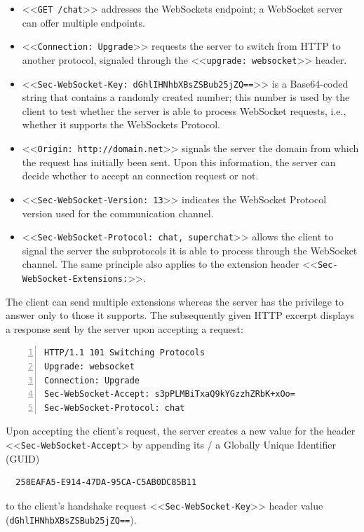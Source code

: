 \documentclass[a4paper, justified, notoc]{tufte-handout} %
\begin{document}
\begin{itemize}
	\item <<\texttt{GET /chat}>> addresses the WebSockets endpoint; a WebSocket server can offer multiple endpoints. 
	\item <<\texttt{Connection: Upgrade}>> requests the server to switch from HTTP to another protocol, signaled through the <<\texttt{upgrade: websocket}>> header. 
	\item <<\texttt{Sec-WebSocket-Key: dGhlIHNhbXBsZSBub25jZQ==}>> is a Base64-coded string that contains a randomly created number; this number is used by the client to test whether the server is able to process WebSocket requests, i.e., whether it supports the WebSockets Protocol. 
	\item <<\texttt{Origin: http://domain.net}>> signals the server the domain from which the request has initially been sent. Upon this information, the server can decide whether to accept an connection request or not.
	\item  <<\texttt{Sec-WebSocket-Version: 13}>> indicates the WebSocket Protocol version used for the communication channel. 
	\item  <<\texttt{Sec-WebSocket-Protocol: chat, superchat}>> allows the client to signal the server the subprotocols it is able to process through the WebSocket channel. The same principle also applies to the extension header <<\texttt{Sec-WebSocket-Extensions:}>>. 
\end{itemize} 

The client can send multiple extensions whereas the server has the privilege to answer only to those it supports. The subsequently given HTTP excerpt displays a response sent by the server upon accepting a request: %

\begin{Verbatim}[gobble=0,frame=lines,numbers=left]
HTTP/1.1 101 Switching Protocols
Upgrade: websocket
Connection: Upgrade
Sec-WebSocket-Accept: s3pPLMBiTxaQ9kYGzzhZRbK+xOo= 
Sec-WebSocket-Protocol: chat
\end{Verbatim}

Upon accepting the client's request, the server creates a new value for the header <<\texttt{Sec-WebSocket-Accept}> by appending its / a Globally Unique Identifier (GUID)
\begin{Verbatim}
  258EAFA5-E914-47DA-95CA-C5AB0DC85B11
\end{Verbatim}
to the client's handshake request <<\texttt{Sec-WebSocket-Key}>> header value (\texttt{dGhlIHNhbXBsZSBub25jZQ==}).
\end{document}
